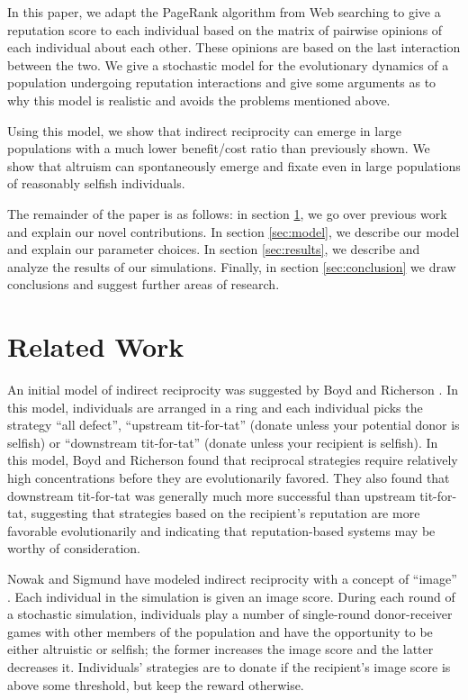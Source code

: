 \documentclass{amsart}
\begin{document}
In this paper, we adapt the PageRank algorithm from Web searching to
give a reputation score to each individual based on the matrix of
pairwise opinions of each individual about each other. These opinions
are based on the last interaction between the two. We give a
stochastic model for the evolutionary dynamics of a population
undergoing reputation interactions and give some arguments as to why
this model is realistic and avoids the problems mentioned above.

Using this model, we show that indirect reciprocity can emerge in
large populations with a much lower benefit/cost ratio than previously
shown. We show that altruism can spontaneously emerge and fixate even
in large populations of reasonably selfish individuals.

The remainder of the paper is as follows: in section
\ref{sec:related}, we go over previous work and explain our novel
contributions. In section \ref{sec:model}, we describe our model and
explain our parameter choices. In section \ref{sec:results}, we
describe and analyze the results of our simulations. Finally, in
section \ref{sec:conclusion} we draw conclusions and suggest further
areas of research.

\section{Related Work}\label{sec:related}

An initial model of indirect reciprocity was suggested by Boyd and
Richerson \cite{boyd_evolution_1989}. In this model, individuals are
arranged in a ring and each individual picks the strategy ``all
defect'', ``upstream tit-for-tat'' (donate unless your potential donor
is selfish) or ``downstream tit-for-tat'' (donate unless your
recipient is selfish). In this model, Boyd and Richerson found that
reciprocal strategies require relatively high concentrations before
they are evolutionarily favored. They also found that downstream
tit-for-tat was generally much more successful than upstream
tit-for-tat, suggesting that strategies based on the recipient's
reputation are more favorable evolutionarily and indicating that
reputation-based systems may be worthy of consideration.

Nowak and Sigmund have modeled indirect reciprocity with a concept of
``image'' \cite{nowak_evolution_1998}. Each individual in the
simulation is given an image score. During each round of a stochastic
simulation, individuals play a number of single-round donor-receiver
games with other members of the population and have the opportunity to
be either altruistic or selfish; the former increases the image score
and the latter decreases it. Individuals’ strategies are to donate if
the recipient’s image score is above some threshold, but keep the
reward otherwise.
\end{document}
